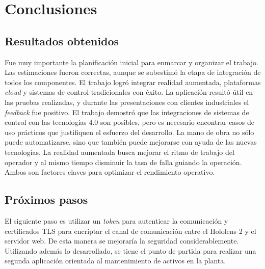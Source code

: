 
\chapter{Conclusiones} %

\label{Chapter5} %


\section{Resultados obtenidos}

Fue muy importante la planificación inicial para enmarcar y organizar el trabajo. Las estimaciones fueron correctas, aunque se subestimó la etapa de integración de todos los componentes. El trabajo logró integrar realidad aumentada, plataformas \textit{cloud} y sistemas de control tradicionales con éxito. La aplicación resultó útil en las pruebas realizadas, y durante las presentaciones con clientes industriales el \textit{feedback} fue positivo. El trabajo demostró que las integraciones de sistemas de control con las tecnologías 4.0 son posibles, pero es necesario encontrar casos de uso prácticos que justifiquen el esfuerzo del desarrollo. La mano de obra no sólo puede automatizarse, sino que también puede mejorarse con ayuda de las nuevas tecnologías. La realidad aumentada busca mejorar el ritmo de trabajo del operador y al mismo tiempo disminuir la tasa de falla guiando la operación. Ambos son factores claves para optimizar el rendimiento operativo.

\section{Próximos pasos}

El siguiente paso es utilizar un \textit{token} para autenticar la comunicación y certificados TLS  para encriptar el canal de comunicación entre el Hololens 2 y el servidor web. De esta manera se mejoraría la seguridad considerablemente. Utilizando además lo desarrollado, se tiene el punto de partida para realizar una segunda aplicación orientada al mantenimiento de activos en la planta.
